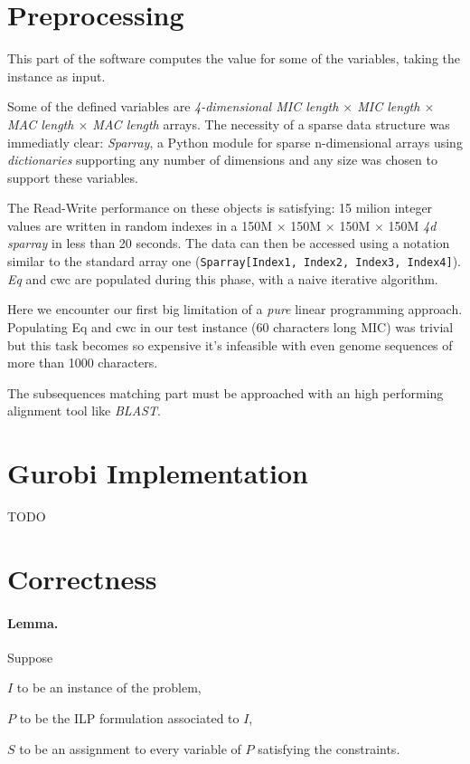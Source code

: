 \section{Preprocessing}
This part of the software computes the value for some of the variables, taking the instance as input.

Some of the defined variables are \textit{4-dimensional MIC length $\times$ MIC length $\times$ MAC length $\times$ MAC length} arrays. The necessity of a sparse data structure was immediatly clear: \textit{Sparray}, a Python module \cite{sparray} for sparse n-dimensional arrays using \textit{dictionaries} supporting any number of dimensions and any size was chosen to support these variables.

The Read-Write performance on these objects is satisfying: 15 milion integer values are written in random indexes in a 150M $\times$ 150M $\times$ 150M $\times$ 150M \textit{4d sparray} in less than 20 seconds. The data can then be accessed using a notation similar to the standard array one (\texttt{Sparray[Index1, Index2, Index3, Index4]}). \textit{Eq} and {cwc} are populated during this phase, with a naive iterative algorithm.

Here we encounter our first big limitation of a \textit{pure} linear programming approach. Populating Eq and cwc in our test instance (60 characters long MIC) was trivial but this task becomes so expensive it's infeasible with even genome sequences of more than 1000 characters.

The subsequences matching part must be approached with an high performing alignment tool like \textit{BLAST}.

\section{Gurobi Implementation}
TODO

\section{Correctness}

\paragraph{Lemma.}
Suppose

$I$ to be an instance of the problem,

$P$ to be the ILP formulation associated to $I$,

$S$ to be an assignment to every variable of $P$ satisfying the constraints.


